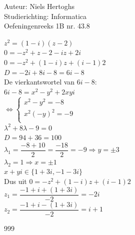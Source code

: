 \documentclass[a4paper]{article}
\begin{document}
  
\noindent \large Auteur: Niels Hertoghs \\
\noindent \large Studierichting: Informatica\\
\noindent \large Oefeningenreeks 1B nr. 43.8\\

\medskip

\normalsize

$z^2 = (1-i)(z-2)$ \\

$0 = -z^2+z-2-iz+2i$\\

$0 = -z^2+(1-i)z+(i-1)2$\\

$D = -2i+8i-8 = 6i-8$\\

De vierkantswortel van $6i-8$: \\

$6i-8 = x^2-y^2+2xyi$\\

$\Leftrightarrow \left \{
\begin{array}{l}
    x^2 - y^2 = -8\\
    x^2(-y)^2 = -9\\
\end{array}
\right .$ \\

$\lambda^2+8\lambda-9 = 0$\\

$D = 94+36 = 100$ \\

$\lambda_{1} = \dfrac{-8+10}{2} = \dfrac{-18}{2} = -9 \Rightarrow y = \pm 3$ \\

$\lambda_{2} = 1 \Rightarrow x = \pm 1$ \\

$x+yi \in \{ 1+3i,-1-3i \}$ \\

Dus uit $0 = -z^2+(1-i)z+(i-1)2$ \\

$z_1 = \dfrac{-1+i+(1+3i)}{-2} = -2i$ \\

$z_2 = \dfrac{-1+i-(1+3i)}{-2} = i+1$ \\



\begin{thebibliography}{999}
\end{thebibliography}
\end{document}
